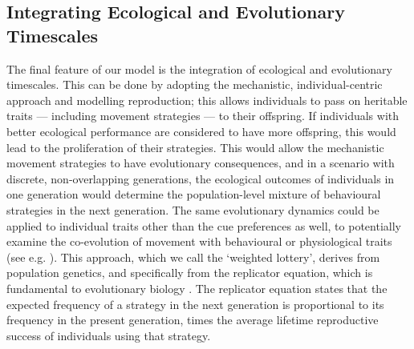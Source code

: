 \subsection*{Integrating Ecological and Evolutionary Timescales}

The final feature of our model is the integration of ecological and evolutionary timescales.
This can be done by adopting the mechanistic, individual-centric approach and modelling reproduction; this allows individuals to pass on heritable traits --- including movement strategies --- to their offspring.
If individuals with better ecological performance are considered to have more offspring, this would lead to the proliferation of their strategies.
This would allow the mechanistic movement strategies to have evolutionary consequences, and in a scenario with discrete, non-overlapping generations, the ecological outcomes of individuals in one generation would determine the population-level mixture of behavioural strategies in the next generation.
The same evolutionary dynamics could be applied to individual traits other than the cue preferences as well, to potentially examine the co-evolution of movement with behavioural or physiological traits (see e.g. \cite{gupte2021a}).
This approach, which we call the `weighted lottery', derives from population genetics, and specifically from the replicator equation, which is fundamental to evolutionary biology \parencite{hofbauer1988}.
The replicator equation states that the expected frequency of a strategy in the next generation is proportional to its frequency in the present generation, times the average lifetime reproductive success of individuals using that strategy.


